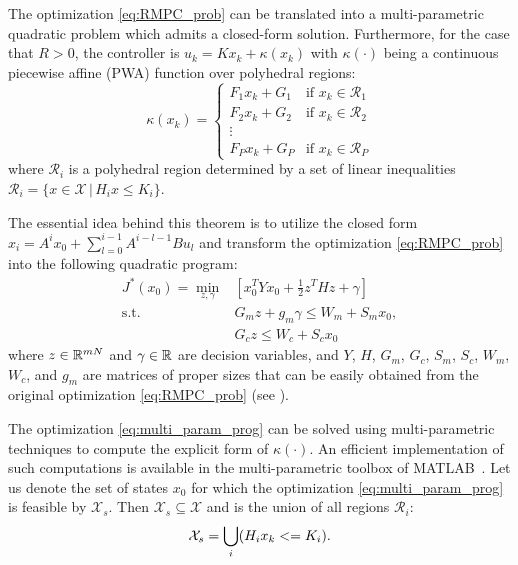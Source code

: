 \begin{theorem}
The optimization \eqref{eq:RMPC_prob} can be translated into a multi-parametric quadratic problem which admits a closed-form solution. Furthermore, for the case that $R>0$, the controller is $u_k = K x_k + \kappa(x_k)$ with $\kappa(\cdot)$ being a continuous piecewise affine (PWA) function over polyhedral regions:
\begin{equation}
\kappa(x_k)=
\begin{cases}
F_1x_k+G_1 & \text{if $x_k\in \mathcal{R}_1$}\\
F_2x_k+G_2 & \text{if $x_k\in \mathcal{R}_2$}\\
\vdots\\
F_Px_k+G_P & \text{if $x_k\in \mathcal{R}_P$}
\end{cases} 
\end{equation}
where $\mathcal{R}_i$ is a polyhedral region determined by a set of linear inequalities $\mathcal R_i = \{x\in\mathcal X\,|\,H_ix\leq K_i\}$. 
\end{theorem}
The essential idea behind this theorem is to utilize the closed form $x_i=A^ix_0+\sum_{l=0}^{i-1}A^{i-l-1}Bu_l$ and transform the optimization \eqref{eq:RMPC_prob} into the following quadratic program:
\begin{align}
\label{eq:multi_param_prog}
J^{\ast}(x_0)=\min_{z,\gamma}& \left[x_0^TYx_0+\frac{1}{2}z^THz+\gamma\right]\\
\text{s.t.} \quad &G_mz+g_m\gamma\leq W_m+S_mx_0,\nonumber\\
&G_cz\leq W_c+S_cx_0\nonumber
\end{align}
where $z\in \mathbb{R}^{mN}$ and $\gamma\in\mathbb{R}$ are decision variables, and $Y$, $H$, $G_m$, $G_c$, $S_m$, $S_c$, $W_m$, $W_c$, and $g_m$ 
are matrices of proper sizes that can be easily obtained from the original optimization \eqref{eq:RMPC_prob}  (see \cite{delaPea:2005}).


The optimization \eqref{eq:multi_param_prog} can be solved using multi-parametric techniques to compute the explicit form of $\kappa(\cdot)$.
An efficient implementation of such computations is available in the multi-parametric toolbox of MATLAB~\cite{matlabMPT, matlabYALMIP}.
Let us denote the set of states $x_0$ for which the optimization  \eqref{eq:multi_param_prog} is feasible by $\mathcal X_s$. Then $\mathcal X_s\subseteq \mathcal X$ and is the union of all regions $\mathcal{R}_{i}$:
\begin{equation}
\mathcal X_s = \bigcup_{i}(H_{i}x_{k}<=K_{i}).
\end{equation}


